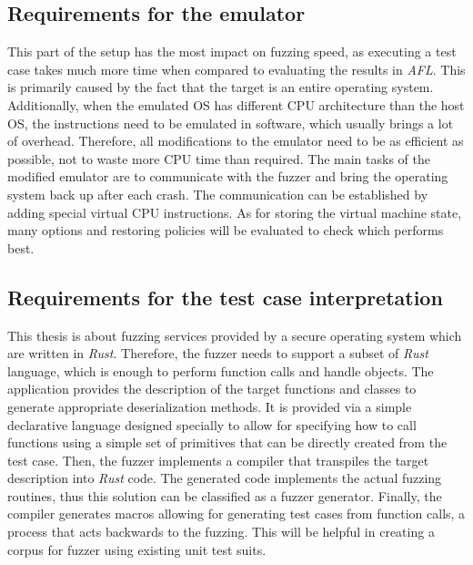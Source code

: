 \subsection{Requirements for the emulator}
This part of the setup has the most impact on fuzzing speed, as executing a test case takes much more time when compared to evaluating the results in \textit{AFL}. This is primarily caused by the fact that the target is an entire operating system. Additionally, when the emulated OS has different CPU architecture than the host OS, the instructions need to be emulated in software, which usually brings a lot of overhead. Therefore, all modifications to the emulator need to be as efficient as possible, not to waste more CPU time than required. The main tasks of the modified emulator are to communicate with the fuzzer and bring the operating system back up after each crash. The communication can be established by adding special virtual CPU instructions. As for storing the virtual machine state, many options and restoring policies will be evaluated to check which performs best.

\subsection{Requirements for the test case interpretation}
This thesis is about fuzzing services provided by a secure operating system which are written in \textit{Rust}. Therefore, the fuzzer needs to support a subset of \textit{Rust} language, which is enough to perform function calls and handle objects. The application provides the description of the target functions and classes to generate appropriate deserialization methods. It is provided via a simple declarative language designed specially to allow for specifying how to call functions using a simple set of primitives that can be directly created from the test case. Then, the fuzzer implements a compiler that transpiles the target description into \textit{Rust} code. The generated code implements the actual fuzzing routines, thus this solution can be classified as a fuzzer generator. Finally, the compiler generates macros allowing for generating test cases from function calls, a process that acts backwards to the fuzzing. This will be helpful in creating a corpus for fuzzer using existing unit test suits. 

